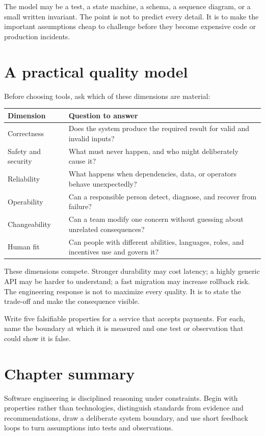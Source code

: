 The model may be a test, a state machine, a schema, a sequence diagram, or a
small written invariant. The point is not to predict every detail. It is to
make the important assumptions cheap to challenge before they become expensive
code or production incidents.

\section{A practical quality model}
Before choosing tools, ask which of these dimensions are material:

\noindent\begin{tabularx}{\textwidth}{@{}p{}X@{}}
\toprule
Dimension & Question to answer \\
\midrule
Correctness & Does the system produce the required result for valid and invalid inputs? \\
Safety and security & What must never happen, and who might deliberately cause it? \\
Reliability & What happens when dependencies, data, or operators behave unexpectedly? \\
Operability & Can a responsible person detect, diagnose, and recover from failure? \\
Changeability & Can a team modify one concern without guessing about unrelated consequences? \\
Human fit & Can people with different abilities, languages, roles, and incentives use and govern it? \\
\bottomrule
\end{tabularx}

These dimensions compete. Stronger durability may cost latency; a highly generic
API may be harder to understand; a fast migration may increase rollback risk.
The engineering response is not to maximize every quality. It is to state the
trade-off and make the consequence visible.

\begin{exercise}
Write five falsifiable properties for a service that accepts payments. For each,
name the boundary at which it is measured and one test or observation that could
show it is false.
\end{exercise}

\section{Chapter summary}
Software engineering is disciplined reasoning under constraints. Begin with
properties rather than technologies, distinguish standards from evidence and
recommendations, draw a deliberate system boundary, and use short feedback
loops to turn assumptions into tests and observations.
